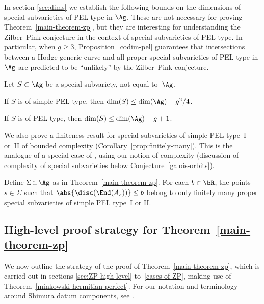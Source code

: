 In section \ref{sec:dims} we establish the following bounds on the dimensions of special subvarieties of PEL type in $\Ag$. These are not necessary for proving Theorem~\ref{main-theorem-zp}, but they are interesting for understanding the Zilber--Pink conjecture in the context of special subvarieties of PEL type.
In particular, when $g \geq 3$, Proposition~\ref{codim-pel} guarantees that intersections between a Hodge generic curve and all proper special subvarieties of PEL type in $\Ag$ are predicted to be ``unlikely'' by the Zilber--Pink conjecture.

\begin{proposition}\label{codim-pel-intro}
Let $S \subset \Ag$ be a special subvariety, not equal to~$\Ag$.
\begin{enumeratei}
\item\label{codim-pel-introi} If $S$ is of simple PEL type, then $\dim(S) \leq \dim(\Ag) - g^2/4$.
\item\label{codim-pel-introii} If $S$ is of PEL type, then $\dim(S) \leq \dim(\Ag) - g + 1$.
\end{enumeratei}
\end{proposition}

We also prove a finiteness result for special subvarieties of simple PEL type~I or~II of bounded complexity (Corollary~\ref{prop:finitely-many}).
This is the analogue of a special case of \cite[Conj.\,10.3]{DR18}, using our notion of complexity (\cf discussion of complexity of special subvarieties below Conjecture~\ref{galois-orbits}).

\begin{proposition}\label{prop:finitely-many-intro}
Define $\Sigma \!\subset\! \Ag$ as in Theorem~\ref{main-theorem-zp}.
For each $b\in\bR$, the points \hbox{$s\!\in\!\Sigma$} such that $\abs{\disc(\End(A_s))} \leq b$ belong to only finitely many proper special subvarieties of simple PEL type~I or II.
\end{proposition}

\subsection{High-level proof strategy for Theorem~\ref{main-theorem-zp}} \label{subsec:proof-strategy-high-level}

We now outline the strategy of the proof of Theorem~\ref{main-theorem-zp}, which is carried out in sections \ref{sec:ZP-high-level} to~\ref{cases-of-ZP}, making use of Theorem~\ref{minkowski-hermitian-perfect}. For our notation and terminology around Shimura datum components, see \cite[\S\S 2.A \&~2.B]{ExCM}.

